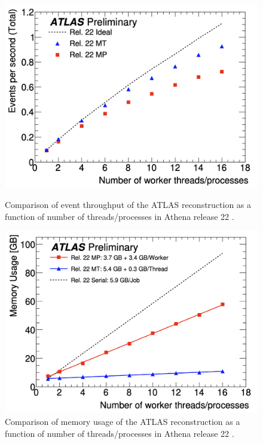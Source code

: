 \vspace{1em}
\begin{figure}
    \centering
    \begin{minipage}{0.49\textwidth}
        \centering
        \includegraphics[width=\linewidth]{figs/chapter3/AthenaMT_throughput.png}
        \caption{Comparison of event throughput of the ATLAS reconstruction as a function of number of threads/processes in Athena release 22 \cite{AthenaMT&MP}.}
        \label{fig:AthenaMT_throughput}
    \end{minipage}
    \hfill
    \begin{minipage}{0.49\textwidth}
        \centering
        \includegraphics[width=\linewidth]{figs/chapter3/AthenaMT_memory.png}
        \caption{Comparison of memory usage of the ATLAS reconstruction as a function of number of threads/processes in Athena release 22 \cite{AthenaMT&MP}.}
        \label{fig:AthenaMT_memory}
    \end{minipage}
\end{figure}

